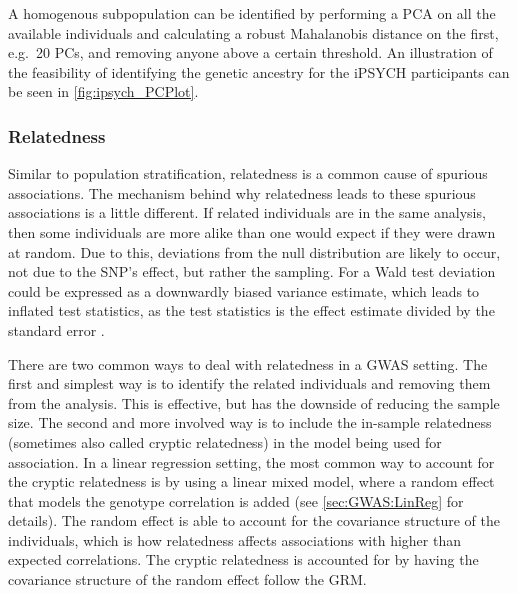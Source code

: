 A homogenous subpopulation can be identified by performing a PCA on all the available individuals and calculating a robust Mahalanobis distance on the first, e.g.\ 20 PCs, and removing anyone above a certain threshold\cite{prive2020efficient}. An illustration of the feasibility of identifying the genetic ancestry for the iPSYCH participants can be seen in \cref{fig:ipsych_PCPlot}.

\subsubsection{Relatedness}
Similar to population stratification, relatedness is a common cause of spurious associations. The mechanism behind why relatedness leads to these spurious associations is a little different. If related individuals are in the same analysis, then some individuals are more alike than one would expect if they were drawn at random. Due to this, deviations from the null distribution are likely to occur, not due to the SNP's effect, but rather the sampling. For a Wald test deviation could be expressed as a downwardly biased variance estimate, which leads to inflated test statistics, as the test statistics is the effect estimate divided by the standard error \cite{astle2009population,voight2005confounding,sillanpaa2011overview}. 

There are two common ways to deal with relatedness in a GWAS setting. The first and simplest way is to identify the related individuals and removing them from the analysis. This is effective, but has the downside of reducing the sample size. The second and more involved way is to include the in-sample relatedness (sometimes also called cryptic relatedness) in the model being used for association. In a linear regression setting, the most common way to account for the cryptic relatedness is by using a linear mixed model, where a random effect that models the genotype correlation is added (see \cref{sec:GWAS:LinReg} for details). The random effect is able to account for the covariance structure of the individuals, which is how relatedness affects associations with higher than expected correlations\cite{yu2006unified, kang2008efficient}. The cryptic relatedness is accounted for by having the covariance structure of the random effect follow the GRM.

